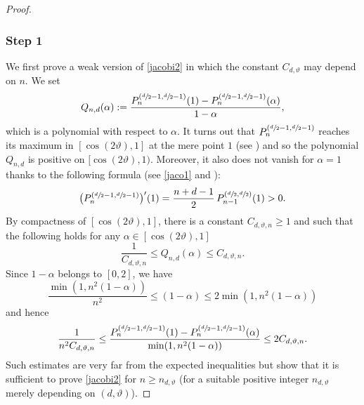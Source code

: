\skpt
\begin{proof}
\subsubsection*{Step 1}
We first prove a weak version of \eqref{jacobi2} in which the constant $C_{d,\vartheta}$ may depend on $n$.
We set
\begin{equation*}
Q_{n,d}(\alpha):=\frac{P_{n}^{(\sfrac{d}{2}-1,\sfrac{d}{2}-1)}(1)-P_{n}^{(\sfrac{d}{2}-1,\sfrac{d}{2}-1)}(\alpha)}{1-\alpha},
\end{equation*}
which is a polynomial with respect to $\alpha$.
It turns out that $P_n^{(\sfrac{d}{2}-1,\sfrac{d}{2}-1)}$ reaches its maximum in $[\cos(2\vartheta),1]$ at the mere point $1$ (see \cite[p.\,168]{szeg}) and so the polynomial $Q_{n,d}$ is positive on $[\cos(2\vartheta),1)$.
Moreover, it also does not vanish for $\alpha=1$ thanks to the following formula
(see \eqref{jaco1} and \cite[p.\,63, (4.21.7)]{szeg}):
\begin{equation}\label{deri-j}
\bigl(P_n^{(\sfrac{d}{2}-1,\sfrac{d}{2}-1)}\bigr)'(1)=\frac{n+d-1}{2}\,P_{n-1}^{(\sfrac{d}{2},\sfrac{d}{2})}(1)>0.
\end{equation}
By compactness of $[\cos(2\vartheta),1]$, there is a constant $C_{d,\vartheta,n}\geq 1$ and such that the following holds for any $\alpha \in [\cos(2\vartheta),1]$
\begin{equation*}
\frac{1}{C_{d,\vartheta,n}}\leq Q_{n,d}(\alpha)\leq C_{d,\vartheta,n}.
\end{equation*}
Since $1-\alpha$ belongs to $[0,2]$, we have
\begin{equation*}
\frac{\min(1,n^2(1-\alpha))}{n^2}\leq (1-\alpha) \leq 2 \min(1,n^2(1-\alpha))
\end{equation*}
and hence
\begin{equation*}
\frac{1}{n^2 C_{d,\vartheta,n}}\leq \frac{P_{n}^{(\sfrac{d}{2}-1,\sfrac{d}{2}-1)}(1)-P_{n}^{(\sfrac{d}{2}-1,\sfrac{d}{2}-1)}(\alpha)}{\min(1,n^2(1-\alpha))}\leq 2C_{d,\vartheta,n}.
\end{equation*}
Such estimates are very far from the expected inequalities but show that it is sufficient to prove \eqref{jacobi2} for $n\geq n_{d,\vartheta}$ (for a suitable positive integer $n_{d,\vartheta}$ merely depending on $(d,\vartheta)$).


\end{proof}
